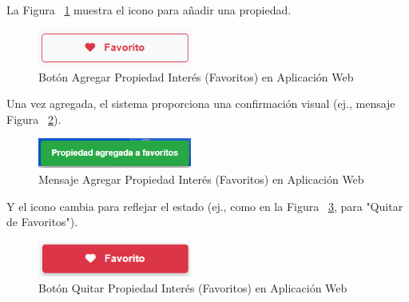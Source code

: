 \begin{enumerate}
\begin{enumerate}
\begin{itemize}
            La Figura ~\ref{fig:botonfavoritoquitado} muestra el icono para añadir una propiedad.

            \begin{figure}[H]
                \begin{center}
                    \includegraphics[width = 0.45\textwidth]{Figuras/botonfavoritoquitado.png}
                \end{center}
                \caption{\label{fig:botonfavoritoquitado} Botón Agregar Propiedad Interés (Favoritos) en Aplicación Web}
            \end{figure}
            
            Una vez agregada, el sistema proporciona una confirmación visual (ej., mensaje Figura ~\ref{fig:pripiedadagregadafavorito}).

            \begin{figure}[H]
                \begin{center}
                    \includegraphics[width = 0.45\textwidth]{Figuras/pripiedadagregadafavorito.png}
                \end{center}
                \caption{\label{fig:pripiedadagregadafavorito} Mensaje Agregar Propiedad Interés (Favoritos) en Aplicación Web}
            \end{figure}
            
            Y el icono cambia para reflejar el estado (ej., como en la Figura ~\ref{fig:botonfavoritoagregado}, para "Quitar de Favoritos").

            \begin{figure}[H]
                \begin{center}
                    \includegraphics[width = 0.45\textwidth]{Figuras/botonfavoritoagregado.png}
                \end{center}
                \caption{\label{fig:botonfavoritoagregado} Botón Quitar Propiedad Interés (Favoritos) en Aplicación Web}
            \end{figure}
            

\end{itemize}
\end{enumerate}
\end{enumerate}
